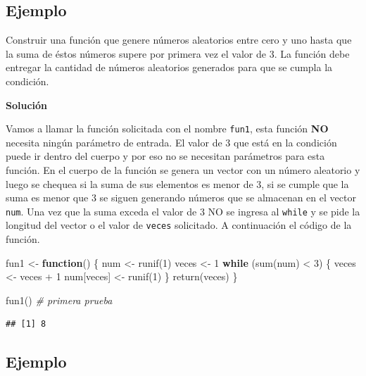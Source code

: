 \documentclass[
]{book}
\makeatletter
\newenvironment{Shaded}{\begin{snugshade}}{\end{snugshade}}
\newcommand{\CommentTok}[1]{\textcolor[rgb]{0.56,0.35,0.01}{\textit{#1}}}
\newcommand{\ControlFlowTok}[1]{\textcolor[rgb]{0.13,0.29,0.53}{\textbf{#1}}}
\newcommand{\DecValTok}[1]{\textcolor[rgb]{0.00,0.00,0.81}{#1}}
\newcommand{\FunctionTok}[1]{\textcolor[rgb]{0.00,0.00,0.00}{#1}}
\newcommand{\NormalTok}[1]{#1}
\newcommand{\OtherTok}[1]{\textcolor[rgb]{0.56,0.35,0.01}{#1}}
\newcommand{\SpecialCharTok}[1]{\textcolor[rgb]{0.00,0.00,0.00}{#1}}
\newenvironment{kframe}{%
\medskip{}
\setlength{\fboxsep}{.8em}
 \def\at@end@of@kframe{}%
 \ifinner\ifhmode%
  \def\at@end@of@kframe{\end{minipage}}%
  \begin{minipage}{\columnwidth}%
 \fi\fi%
 \def\FrameCommand##1{\hskip\@totalleftmargin \hskip-\fboxsep
 \colorbox{shadecolor}{##1}\hskip-\fboxsep
     \hskip-\linewidth \hskip-\@totalleftmargin \hskip\columnwidth}%
 \MakeFramed {\advance\hsize-\width
   \@totalleftmargin\z@ \linewidth\hsize
   \@setminipage}}%
 {\par\unskip\endMakeFramed%
 \at@end@of@kframe}
\renewenvironment{Shaded}{\begin{kframe}}{\end{kframe}}
\makeatother
\begin{document}
\hypertarget{ejemplo-21}{%
\subsection*{Ejemplo}\label{ejemplo-21}}

Construir una función que genere números aleatorios entre cero y uno hasta que la suma de éstos números supere por primera vez el valor de 3. La función debe entregar la cantidad de números aleatorios generados para que se cumpla la condición.

\textbf{Solución}

Vamos a llamar la función solicitada con el nombre \texttt{fun1}, esta función \textbf{NO} necesita ningún parámetro de entrada. El valor de 3 que está en la condición puede ir dentro del cuerpo y por eso no se necesitan parámetros para esta función. En el cuerpo de la función se genera un vector con un número aleatorio y luego se chequea si la suma de sus elementos es menor de 3, si se cumple que la suma es menor que 3 se siguen generando números que se almacenan en el vector \texttt{num}. Una vez que la suma exceda el valor de 3 NO se ingresa al \texttt{while} y se pide la longitud del vector o el valor de \texttt{veces} solicitado. A continuación el código de la función.

\begin{Shaded}
\begin{Highlighting}[]
\NormalTok{fun1 }\OtherTok{\textless{}{-}} \ControlFlowTok{function}\NormalTok{() \{}
\NormalTok{  num }\OtherTok{\textless{}{-}} \FunctionTok{runif}\NormalTok{(}\DecValTok{1}\NormalTok{)}
\NormalTok{  veces }\OtherTok{\textless{}{-}} \DecValTok{1}
  \ControlFlowTok{while}\NormalTok{ (}\FunctionTok{sum}\NormalTok{(num) }\SpecialCharTok{\textless{}} \DecValTok{3}\NormalTok{) \{}
\NormalTok{    veces }\OtherTok{\textless{}{-}}\NormalTok{ veces }\SpecialCharTok{+} \DecValTok{1}
\NormalTok{    num[veces] }\OtherTok{\textless{}{-}} \FunctionTok{runif}\NormalTok{(}\DecValTok{1}\NormalTok{)}
\NormalTok{  \}}
  \FunctionTok{return}\NormalTok{(veces)}
\NormalTok{\}}

\FunctionTok{fun1}\NormalTok{()  }\CommentTok{\# primera prueba}
\end{Highlighting}
\end{Shaded}

\begin{verbatim}
## [1] 8
\end{verbatim}

\hypertarget{ejemplo-22}{%
\subsection*{Ejemplo}\label{ejemplo-22}}
\end{document}
